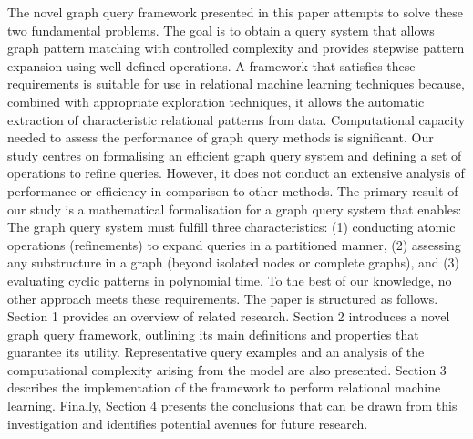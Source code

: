 \documentclass{article}%
\begin{document}
\newline%
The novel graph query framework presented in this paper attempts to solve these two fundamental problems. The goal is to obtain a query system that allows graph pattern matching with controlled complexity and provides stepwise pattern expansion using well{-}defined operations. A framework that satisfies these requirements is suitable for use in relational machine learning techniques because, combined with appropriate exploration techniques, it allows the automatic extraction of characteristic relational patterns from data.\newline%
\newline%
Computational capacity needed to assess the performance of graph query methods is significant. Our study centres on formalising an efficient graph query system and defining a set of operations to refine queries. However, it does not conduct an extensive analysis of performance or efficiency in comparison to other methods. The primary result of our study is a mathematical formalisation for a graph query system that enables: The graph query system must fulfill three characteristics: (1) conducting atomic operations (refinements) to expand queries in a partitioned manner, (2) assessing any substructure in a graph (beyond isolated nodes or complete graphs), and (3) evaluating cyclic patterns in polynomial time. To the best of our knowledge, no other approach meets these requirements.\newline%
\newline%
The paper is structured as follows. Section 1 provides an overview of related research. Section 2 introduces a novel graph query framework, outlining its main definitions and properties that guarantee its utility. Representative query examples and an analysis of the computational complexity arising from the model are also presented. Section 3 describes the implementation of the framework to perform relational machine learning. Finally, Section 4 presents the conclusions that can be drawn from this investigation and identifies potential avenues for future research.

%
\end{document}
